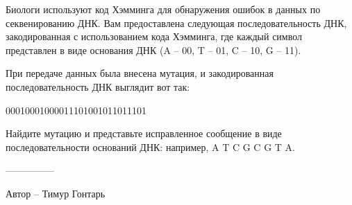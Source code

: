 \question
Биологи используют код Хэмминга для обнаружения ошибок в данных по секвенированию ДНК. Вам предоставлена следующая последовательность ДНК, закодированная с использованием кода Хэмминга, где каждый символ представлен в виде основания ДНК (A -- 00, T -- 01, C -- 10, G -- 11).

При передаче данных была внесена мутация, и закодированная последовательность ДНК выглядит вот так: 
\begin{center}
00010001000011101001011011101
\end{center}

Найдите мутацию и представьте исправленное сообщение в виде последовательности оснований ДНК: например, A T C G C G T A.

---------------

Автор -- Тимур Гонтарь